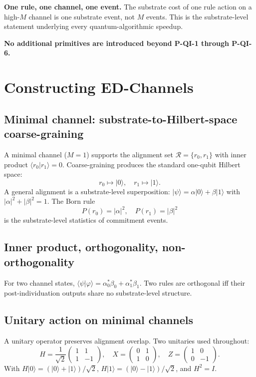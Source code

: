 \documentclass[11pt,a4paper]{article}
\begin{document}
\textbf{One rule, one channel, one event.} The substrate cost of one rule action on a high-$M$ channel is one substrate event, not $M$ events. This is the substrate-level statement underlying every quantum-algorithmic speedup.

\textbf{No additional primitives are introduced beyond P-QI-1 through P-QI-6.}

\section{Constructing ED-Channels}

\subsection{Minimal channel: substrate-to-Hilbert-space coarse-graining}

A minimal channel ($M = 1$) supports the alignment set $\mathcal{R} = \{r_0, r_1\}$ with inner product $\langle r_0 | r_1\rangle = 0$. Coarse-graining produces the standard one-qubit Hilbert space:
\[
r_0 \mapsto |0\rangle, \quad r_1 \mapsto |1\rangle.
\]
A general alignment is a substrate-level superposition: $|\psi\rangle = \alpha|0\rangle + \beta|1\rangle$ with $|\alpha|^2 + |\beta|^2 = 1$. The Born rule
\[
P(r_0) = |\alpha|^2, \quad P(r_1) = |\beta|^2
\]
is the substrate-level statistics of commitment events.

\subsection{Inner product, orthogonality, non-orthogonality}

For two channel states, $\langle\psi|\varphi\rangle = \alpha_0^*\beta_0 + \alpha_1^*\beta_1$. Two rules are orthogonal iff their post-individuation outputs share no substrate-level structure.

\subsection{Unitary action on minimal channels}

A unitary operator preserves alignment overlap. Two unitaries used throughout:
\[
H = \frac{1}{\sqrt{2}}\begin{pmatrix} 1 & 1 \\ 1 & -1 \end{pmatrix}, \quad X = \begin{pmatrix} 0 & 1 \\ 1 & 0 \end{pmatrix}, \quad Z = \begin{pmatrix} 1 & 0 \\ 0 & -1 \end{pmatrix}.
\]
With $H|0\rangle = (|0\rangle + |1\rangle)/\sqrt{2}$, $H|1\rangle = (|0\rangle - |1\rangle)/\sqrt{2}$, and $H^2 = I$.
\end{document}

